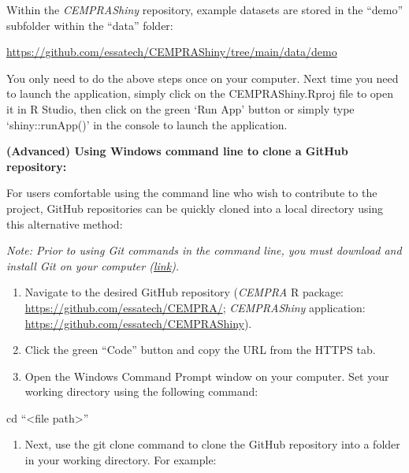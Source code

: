 \documentclass[
  letterpaper,
  DIV=11,
  numbers=noendperiod]{scrreprt}
\newenvironment{Shaded}{\begin{snugshade}}{\end{snugshade}}
\newcommand{\BuiltInTok}[1]{\textcolor[rgb]{0.00,0.23,0.31}{#1}}
\newcommand{\NormalTok}[1]{\textcolor[rgb]{0.00,0.23,0.31}{#1}}
\newcommand{\OperatorTok}[1]{\textcolor[rgb]{0.37,0.37,0.37}{#1}}
\providecommand{\tightlist}{%
  \setlength{\itemsep}{0pt}\setlength{\parskip}{0pt}}\usepackage{longtable,booktabs,array}
\begin{document}
Within the \emph{CEMPRAShiny} repository, example datasets are stored in
the ``demo'' subfolder within the ``data'' folder:

\url{https://github.com/essatech/CEMPRAShiny/tree/main/data/demo}

You only need to do the above steps once on your computer. Next time you
need to launch the application, simply click on the CEMPRAShiny.Rproj
file to open it in R Studio, then click on the green `Run App' button or
simply type `shiny::runApp()' in the console to launch the application.

\textbf{(Advanced) Using Windows command line to clone a GitHub
repository:}

For users comfortable using the command line who wish to contribute to
the project, GitHub repositories can be quickly cloned into a local
directory using this alternative method:

\emph{Note: Prior to using Git commands in the command line, you must
download and install Git on your computer
(\href{https://github.com/git-guides/install-git}{link}).}

\begin{enumerate}
\def\labelenumi{\arabic{enumi}.}
\item
  Navigate to the desired GitHub repository (\emph{CEMPRA} R package:
  \url{https://github.com/essatech/CEMPRA/}; \emph{CEMPRAShiny}
  application: \url{https://github.com/essatech/CEMPRAShiny}).
\item
  Click the green ``Code'' button and copy the URL from the HTTPS tab.
\item
  Open the Windows Command Prompt window on your computer. Set your
  working directory using the following command:
\end{enumerate}

\begin{Shaded}
\begin{Highlighting}[]
\BuiltInTok{cd}\NormalTok{ “}\OperatorTok{\textless{}}\NormalTok{file path}\OperatorTok{\textgreater{}}\NormalTok{”}
\end{Highlighting}
\end{Shaded}

\begin{enumerate}
\def\labelenumi{\arabic{enumi}.}
\setcounter{enumi}{3}
\tightlist
\item
  Next, use the git clone command to clone the GitHub repository into a
  folder in your working directory. For example:
\end{enumerate}
\end{document}

